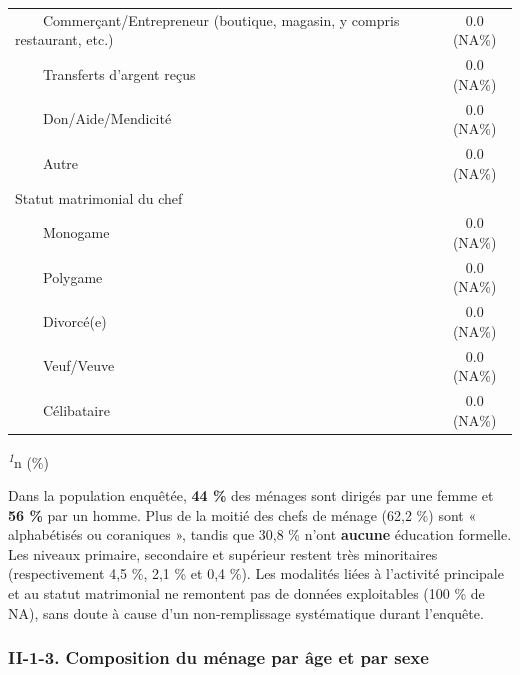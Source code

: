 \documentclass[
]{article}
\begin{document}
\begin{table}[!t]
\begin{tabular*}{\linewidth}{@{\extracolsep{\fill}}lc}
    Commerçant/Entrepreneur (boutique, magasin, y compris restaurant, etc.) & 0.0 (NA\%) \\ 
    Transferts d'argent reçus & 0.0 (NA\%) \\ 
    Don/Aide/Mendicité & 0.0 (NA\%) \\ 
    Autre & 0.0 (NA\%) \\ 
Statut matrimonial du chef &  \\ 
    Monogame & 0.0 (NA\%) \\ 
    Polygame & 0.0 (NA\%) \\ 
    Divorcé(e) & 0.0 (NA\%) \\ 
    Veuf/Veuve & 0.0 (NA\%) \\ 
    Célibataire & 0.0 (NA\%) \\ 
\bottomrule
\end{tabular*}
\begin{minipage}{\linewidth}
\textsuperscript{\textit{1}}n (\%)\\
\end{minipage}
\end{table}

Dans la population enquêtée, \textbf{44 \%} des ménages sont dirigés par
une femme et \textbf{56 \%} par un homme. Plus de la moitié des chefs de
ménage (62,2 \%) sont « alphabétisés ou coraniques », tandis que 30,8 \%
n'ont \textbf{aucune} éducation formelle. Les niveaux primaire,
secondaire et supérieur restent très minoritaires (respectivement 4,5
\%, 2,1 \% et 0,4 \%). Les modalités liées à l'activité principale et au
statut matrimonial ne remontent pas de données exploitables (100 \% de
NA), sans doute à cause d'un non-remplissage systématique durant
l'enquête.

\hypertarget{ii-1-3.-composition-du-muxe9nage-par-uxe2ge-et-par-sexe}{%
\subsubsection{II-1-3. Composition du ménage par âge et par
sexe}\label{ii-1-3.-composition-du-muxe9nage-par-uxe2ge-et-par-sexe}}
\end{document}
